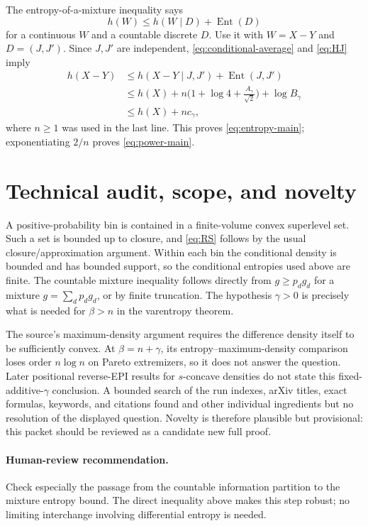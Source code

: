 \documentclass[11pt]{article}
\newcommand{\Ent}{\operatorname{Ent}}
\begin{document}
The entropy-of-a-mixture inequality says
\[
 h(W)\le h(W\mid D)+\Ent(D)
\]
for a continuous $W$ and a countable discrete $D$.  Use it with
$W=X-Y$ and $D=(J,J')$.  Since $J,J'$ are independent, \eqref{eq:conditional-average}
and \eqref{eq:HJ} imply
\begin{align*}
 h(X-Y)
 &\le h(X-Y\mid J,J')+\Ent(J,J')\\
 &\le h(X)+n\biggl(1+\log4+\frac{A_\gamma}{\sqrt2}\biggr)
       +\log B_\gamma\\
 &\le h(X)+n c_\gamma,
\end{align*}
where $n\ge1$ was used in the last line.  This proves
\eqref{eq:entropy-main}; exponentiating $2/n$ proves
\eqref{eq:power-main}.

\section{Technical audit, scope, and novelty}

A positive-probability bin is contained in a finite-volume convex superlevel
set.  Such a set is bounded up to closure, and \eqref{eq:RS} follows by the
usual closure/approximation argument.  Within each bin the conditional density
is bounded and has bounded support, so the conditional entropies used above
are finite.  The countable mixture inequality follows directly from
$g\ge p_dg_d$ for a mixture $g=\sum_dp_dg_d$, or by finite truncation.
The hypothesis $\gamma>0$ is precisely what is needed for $\beta>n$ in the
varentropy theorem.

The source's maximum-density argument requires the difference density itself
to be sufficiently convex.  At $\beta=n+\gamma$, its entropy--maximum-density
comparison loses order $n\log n$ on Pareto extremizers, so it does not answer
the question.  Later positional reverse-EPI results for $s$-concave densities
do not state this fixed-additive-$\gamma$ conclusion.  A bounded search of the
run indexes, arXiv titles, exact formulas, keywords, and citations found
\cite{FLM} and other individual ingredients but no resolution of the displayed
question.  Novelty is therefore plausible but provisional: this packet should
be reviewed as a candidate new full proof.

\paragraph{Human-review recommendation.}
Check especially the passage from the countable information partition to the
mixture entropy bound.  The direct inequality above makes this step robust;
no limiting interchange involving differential entropy is needed.
\end{document}
